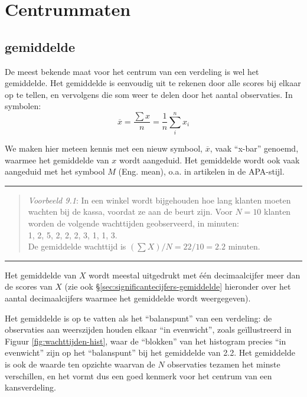 \documentclass[
]{book}
\begin{document}
\hypertarget{centrummaten}{%
\section{Centrummaten}\label{centrummaten}}

\hypertarget{sec:gemiddelde}{%
\subsection{gemiddelde}\label{sec:gemiddelde}}

De meest bekende maat voor het centrum van een verdeling is wel het
gemiddelde. Het gemiddelde is eenvoudig uit te rekenen door alle scores
bij elkaar op te tellen, en vervolgens die som weer te delen door het
aantal observaties. In symbolen:
\begin{equation} 
  \overline{x} = \frac{\sum x}{n} = \frac{1}{n} \sum\limits_{i}^n x_i
  \label{eq:gemiddelde}
\end{equation}

We maken hier meteen kennis met een nieuw symbool, \(\overline{x}\), vaak
``x-bar'' genoemd, waarmee het gemiddelde van \(x\) wordt aangeduid. Het gemiddelde
wordt ook vaak aangeduid met het symbool \(M\) (Eng. mean), o.a. in
artikelen in de APA-stijl.

\begin{center}\rule{0.5\linewidth}{0.5pt}\end{center}

\begin{quote}
\emph{Voorbeeld 9.1}: In
een winkel wordt bijgehouden hoe lang klanten moeten wachten bij de
kassa, voordat ze aan de beurt zijn. Voor \(N=10\) klanten worden de
volgende wachttijden geobserveerd, in minuten:\\
1, 2, 5, 2, 2, 2, 3, 1, 1, 3.\\
De gemiddelde wachttijd is \((\sum X)/N = 22/10 = 2.2\) minuten.
\end{quote}

\begin{center}\rule{0.5\linewidth}{0.5pt}\end{center}

Het gemiddelde van \(X\) wordt meestal uitgedrukt met één decimaalcijfer meer dan
de scores van \(X\) (zie ook §\ref{sec:significantecijfers-gemiddelde} hieronder over het aantal decimaalcijfers waarmee het gemiddelde wordt weergegeven).

Het gemiddelde is op te vatten als het ``balanspunt'' van een verdeling:
de observaties aan weerszijden houden elkaar ``in evenwicht'', zoals
geïllustreerd in Figuur \ref{fig:wachttijden-hist}, waar de ``blokken'' van het histogram
precies ``in evenwicht'' zijn op het ``balanspunt'' bij het gemiddelde van
2.2. Het gemiddelde is ook de waarde ten opzichte waarvan de \(N\)
observaties tezamen het minste verschillen, en het vormt dus een goed
kenmerk voor het centrum van een kansverdeling.
\end{document}
